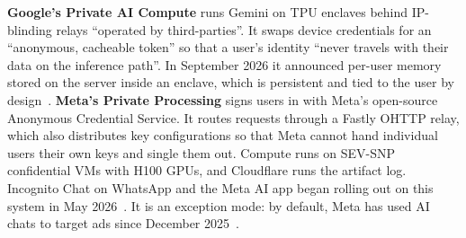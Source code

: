\documentclass[10pt,a4paper]{article}
\begin{document}
\textbf{Google's Private AI Compute} runs Gemini on TPU enclaves behind IP-blinding relays ``operated by third-parties''. It swaps device credentials for an ``anonymous, cacheable token'' so that a user's identity ``never travels with their data on the inference path''. In September 2026 it announced per-user memory stored on the server inside an enclave, which is persistent and tied to the user by design~\cite{google-private-ai-compute,help-net-security-private}. \textbf{Meta's Private Processing} signs users in with Meta's open-source Anonymous Credential Service. It routes requests through a Fastly OHTTP relay, which also distributes key configurations so that Meta cannot hand individual users their own keys and single them out. Compute runs on SEV-SNP confidential VMs with H100 GPUs, and Cloudflare runs the artifact log. Incognito Chat on WhatsApp and the Meta AI app began rolling out on this system in May 2026~\cite{meta-private-processing-te,meta-newsroom-incognito-ch}. It is an exception mode: by default, Meta has used AI chats to target ads since December 2025~\cite{the-register-meta-ai}.
\end{document}

